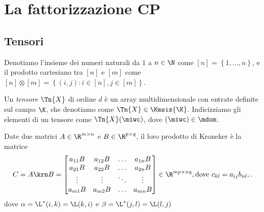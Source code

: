 \chapter{La fattorizzazione CP}


\section{Tensori}

\begin{definition}
  Denotiamo l'insieme dei numeri naturali da $ 1 $ a $ n \in \N $ come $ [n] = \left\{ 1,\dots,n
  \right\} $, e il prodotto cartesiano tra $ [n] $ e $ [m] $ come $ [n] \otimes [m] =
  \left\{ (i,j) : i \in [n], j \in [m] \right\} $.
\end{definition}

\begin{definition}
  Un \emph{tensore} $ \Tn{X}  $ di ordine $ d $ è un array multidimensionale con entrate definite sul campo $
  \K $, che denotiamo come $  \Tn{X} \in \Kmsiz{\K} $. Indicizziamo gli elementi di un tensore come
  $ \Tn{X}(\miwc) $, dove $ (\miwc) \in \mdom$.
\end{definition}





\begin{definition}
  Date due matrici $ A \in \R^{m \times n} $ e $ B \in \R^{p \times q} $, il loro prodotto
  di Kroneker è la matrice 
  \[
  C = A \krn B = 
  \begin{bmatrix} 
    a_{11}B & a_{12}B & \ldots & a_{1n}B \\ 
    a_{21}B & a_{22}B & \ldots & a_{2n}B \\ 
    \vdots & \vdots & \ddots & \vdots \\ 
    a_{m1}B & a_{m2}B & \ldots & a_{mn}B \\ 
  \end{bmatrix}  \in  \R^{mp \times nq}, \text{dove } c_{kl} = a_{ij}b_{nl},
  .\] 
  dove $ \alpha = \L^*(i,k) = \L(k,i) $ e $ \beta = \L^*(j,l) = \L(l,j) $
  
\end{definition}

